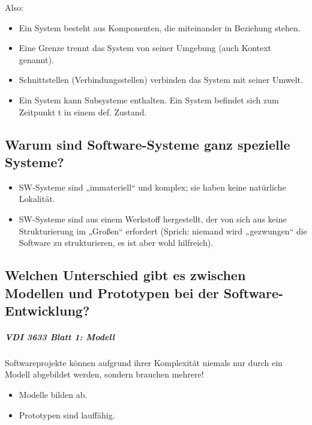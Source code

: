 Also:
\begin{itemize}
\item Ein System besteht aus Komponenten, die miteinander in Beziehung stehen.
\item Eine Grenze trennt das System von seiner Umgebung (auch Kontext genannt).
\item Schnittstellen (Verbindungsstellen) verbinden das System mit seiner Umwelt.
\item Ein System kann Subsysteme enthalten. Ein System befindet sich zum Zeitpunkt t in einem def. Zustand.
\end{itemize}


\subsection{Warum sind Software-Systeme ganz spezielle Systeme?}
\begin{itemize}
\item SW-Systeme sind „immateriell“ und komplex; sie haben keine natürliche Lokalität.
\item SW-Systeme sind aus einem Werkstoff hergestellt, der von sich aus keine Strukturierung im „Großen“ erfordert (Sprich: niemand wird „gezwungen“ die Software zu strukturieren, es ist aber wohl hilfreich).
\end{itemize}

\subsection{Welchen Unterschied gibt es zwischen Modellen und Prototypen bei der Software-Entwicklung?}
\subparagraph{VDI 3633 Blatt 1: Modell}
Softwareprojekte können aufgrund ihrer Komplexität niemals nur durch ein Modell abgebildet werden, sondern brauchen mehrere!
\begin{itemize}
\item Modelle bilden ab.
\item Prototypen sind lauffähig.
\end{itemize}

